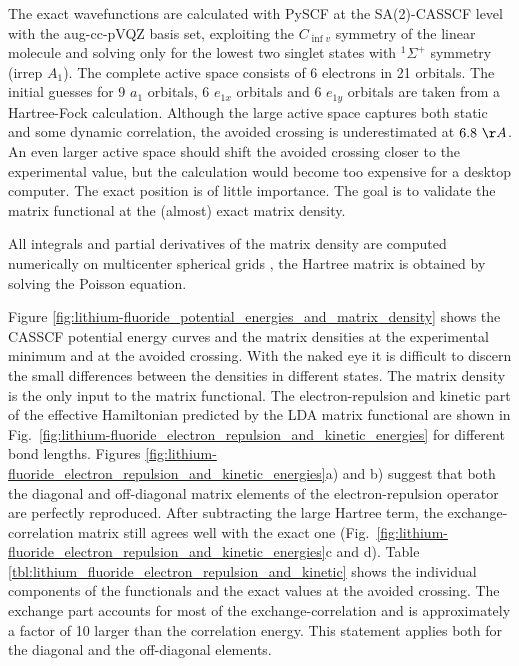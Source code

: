 \documentclass[journal=jpclcd,manuscript=letter]{achemso}
\begin{document}
The exact wavefunctions are calculated with PySCF \cite{Sun2020} at the SA(2)-CASSCF level
with the aug-cc-pVQZ basis set\cite{Dunning1989gaussianI,Kendall1992electron,basis_set_exchange},
exploiting the $C_{\inf v}$ symmetry of the linear molecule and solving only for the lowest two singlet states
with $^1\Sigma^+$ symmetry (irrep $A_1$). The complete active space consists of 6 electrons in 21 orbitals.
The initial guesses for 9 $a_1$ orbitals, 6 $e_{1x}$ orbitals and 6 $e_{1y}$ orbitals are taken from a Hartree-Fock calculation.
Although the large active space captures
both static and some dynamic correlation, the avoided crossing is underestimated at $6.8~\AA$. An even larger active space
should shift the avoided crossing closer to the experimental value, but the calculation would become too
expensive for a desktop computer. The exact position is of little importance. 
The goal is to validate the matrix functional at the (almost) exact matrix density.

All integrals and partial derivatives of the matrix density are computed numerically on
multicenter spherical grids \cite{Becke1988grid,Lebedev1976}, the Hartree matrix is obtained by solving the Poisson
equation. \cite{Becke1988Poisson}

Figure \ref{fig:lithium-fluoride_potential_energies_and_matrix_density} shows the CASSCF potential energy curves
and the matrix densities at the experimental minimum and at the avoided crossing.
With the naked eye it is difficult to discern the small differences between the densities in different states.
The matrix density is the only input to the matrix functional. 
The electron-repulsion and kinetic part of the effective Hamiltonian predicted by the LDA matrix functional
are shown in Fig.~\ref{fig:lithium-fluoride_electron_repulsion_and_kinetic_energies} for different bond lengths. 
Figures \ref{fig:lithium-fluoride_electron_repulsion_and_kinetic_energies}a) and b)
suggest that both the diagonal and off-diagonal matrix elements of the electron-repulsion operator are
perfectly reproduced. After subtracting the large Hartree term, the exchange-correlation matrix still agrees
well with the exact one (Fig.~\ref{fig:lithium-fluoride_electron_repulsion_and_kinetic_energies}c and d).
Table \ref{tbl:lithium_fluoride_electron_repulsion_and_kinetic} shows the individual components of the functionals
and the exact values at the avoided crossing.
The exchange part accounts for most of the exchange-correlation and is approximately a factor of 10 larger than the correlation energy.
This statement applies both for the diagonal and the off-diagonal elements.
\end{document}
